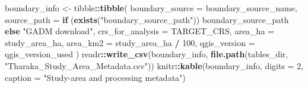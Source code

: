 \documentclass[
]{article}
\newenvironment{Shaded}{\begin{snugshade}}{\end{snugshade}}
\newcommand{\AttributeTok}[1]{\textcolor[rgb]{0.13,0.29,0.53}{#1}}
\newcommand{\ControlFlowTok}[1]{\textcolor[rgb]{0.13,0.29,0.53}{\textbf{#1}}}
\newcommand{\DecValTok}[1]{\textcolor[rgb]{0.00,0.00,0.81}{#1}}
\newcommand{\FunctionTok}[1]{\textcolor[rgb]{0.13,0.29,0.53}{\textbf{#1}}}
\newcommand{\NormalTok}[1]{#1}
\newcommand{\OtherTok}[1]{\textcolor[rgb]{0.56,0.35,0.01}{#1}}
\newcommand{\SpecialCharTok}[1]{\textcolor[rgb]{0.81,0.36,0.00}{\textbf{#1}}}
\newcommand{\StringTok}[1]{\textcolor[rgb]{0.31,0.60,0.02}{#1}}
\begin{document}
\begin{Shaded}
\begin{Highlighting}[]
\NormalTok{boundary\_info }\OtherTok{\textless{}{-}}\NormalTok{ tibble}\SpecialCharTok{::}\FunctionTok{tibble}\NormalTok{(}
  \AttributeTok{boundary\_source =}\NormalTok{ boundary\_source\_name,}
  \AttributeTok{source\_path =} \ControlFlowTok{if}\NormalTok{ (}\FunctionTok{exists}\NormalTok{(}\StringTok{"boundary\_source\_path"}\NormalTok{)) boundary\_source\_path }\ControlFlowTok{else} \StringTok{"GADM download"}\NormalTok{,}
  \AttributeTok{crs\_for\_analysis =}\NormalTok{ TARGET\_CRS,}
  \AttributeTok{area\_ha =}\NormalTok{ study\_area\_ha,}
  \AttributeTok{area\_km2 =}\NormalTok{ study\_area\_ha }\SpecialCharTok{/} \DecValTok{100}\NormalTok{,}
  \AttributeTok{qgis\_version =}\NormalTok{ qgis\_version\_used}
\NormalTok{)}
\NormalTok{readr}\SpecialCharTok{::}\FunctionTok{write\_csv}\NormalTok{(boundary\_info, }\FunctionTok{file.path}\NormalTok{(tables\_dir, }\StringTok{"Tharaka\_Study\_Area\_Metadata.csv"}\NormalTok{))}
\NormalTok{knitr}\SpecialCharTok{::}\FunctionTok{kable}\NormalTok{(boundary\_info, }\AttributeTok{digits =} \DecValTok{2}\NormalTok{, }\AttributeTok{caption =} \StringTok{"Study{-}area and processing metadata"}\NormalTok{)}
\end{Highlighting}
\end{Shaded}
\end{document}
